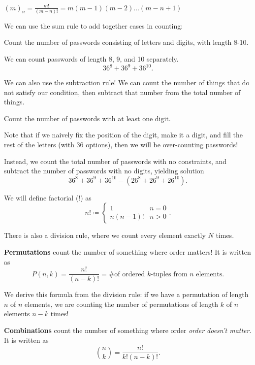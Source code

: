 \documentclass[a4paper]{article}
\begin{document}
\begin{notation}
	\( (m)_n = \frac{m!}{(m-n)!} = m(m-1)(m-2)\ldots (m-n+1)\) 
\end{notation}

We can use the sum rule to add together cases in counting:

\begin{eg}
	Count the number of passwords consisting of letters and digits, with length 8-10.
\end{eg}

We can count passwords of length 8, 9, and 10 separately. \[
	36^8+36^9+36^{10}
.\] 

We can also use the subtraction rule! We can count the number of things that do not satisfy our condition, then subtract that number from the total number of things.

\begin{eg}
	Count the number of passwords with at least one digit.
\end{eg}
Note that if we naively fix the position of the digit, make it a digit, and fill the rest of the letters (with 36 options), then we will be over-counting passwords!

Instead, we count the total number of passwords with no constraints, and subtract the number of passwords with no digits, yielding solution \[
	36^8+36^9+36^{10} - (26^8+26^9+26^{10})
.\] 

\begin{notation}
	We will define factorial (!) as \[
		n! \coloneq \begin{cases}
			1 & n=0\\
			n(n-1)! & n>0
		\end{cases}
	.\]
\end{notation}

There is also a division rule, where we count every element exactly \( N \) times.

\begin{definition}
	\textbf{Permutations} count the number of something where order matters! It is written as \[
		P(n,k)=\frac{n!}{(n-k)!}= \text{\# of ordered }k\text{-tuples from } n \text{ elements}
	.\] 
\end{definition}

We derive this formula from the division rule: if we have a permutation of length \( n \) of \( n \) elements, we are counting the number of permutations of length \( k \) of \( n \) elements \( n-k \) times!

\begin{definition}
	\textbf{Combinations} count the number of something where order \textit{order doesn't matter}. It is written as \[
		\binom{n}{k} = \frac{n!}{k!(n-k)!}
	.\] 
\end{definition}
\end{document}
